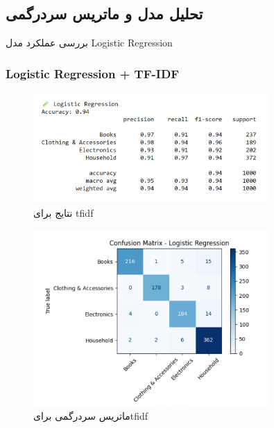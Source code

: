\documentclass[a4paper,12pt]{article}
\begin{document}
\subsection*{ تحلیل مدل و ماتریس سردرگمی}

بررسی عملکرد مدل Logistic Regression

\subsubsection*{Logistic Regression + TF-IDF}
\begin{figure}[H]
    \centering
    \includegraphics[width=0.8\textwidth]{lrTfidf.png}
    \caption*{نتایج برای tfidf}
    \label{fig:yourlabel}
\end{figure}
\begin{figure}[H]
    \centering
    \includegraphics[width=0.8\textwidth]{tfidfConfusionMatrix.png}
    \caption*{ماتریس سردرگمی برایtfidf }
    \label{fig:yourlabel}
\end{figure}
\end{document}
